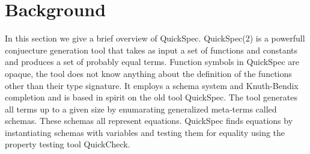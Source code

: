 \section{Background}
In this section we give a brief overview of
QuickSpec.
QuickSpec(2) is a powerfull conjuecture generation
tool that takes as input a set of functions and constants
and produces a set of probably equal terms.
Function symbols in QuickSpec are opaque, the tool
does not know anything about the definition of
the functions other than their type signature.
It employs a schema system and Knuth-Bendix
completion and is based in spirit on the old
tool QuickSpec\cite{Claessen2010}.
The tool generates all terms up to a given
size by enumarating generalized meta-terms called
schemas. These schemas all represent
equations. QuickSpec finds equations by instantiating
schemas with variables and testing them for equality
using the property testing tool QuickCheck\cite{Claessen2000}.
